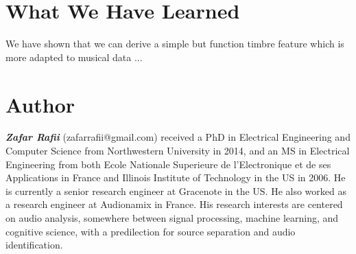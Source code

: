 \documentclass[journal]{IEEEtran}
\begin{document}
\section{What We Have Learned}

We have shown that we can derive a simple but function timbre feature which is more adapted to musical data ...




\section{Author}

\textit{\textbf{Zafar Rafii}} (zafarrafii@gmail.com) received a PhD in Electrical Engineering and Computer Science from Northwestern University in 2014, and an MS in Electrical Engineering from both Ecole Nationale Superieure de l’Electronique et de ses Applications in France and Illinois Institute of Technology in the US in 2006. He is currently a senior research engineer at Gracenote in the US. He also worked as a research engineer at Audionamix in France. His research interests are centered on audio analysis, somewhere between signal processing, machine learning, and cognitive science, with a predilection for source separation and audio identification.



\end{document}
